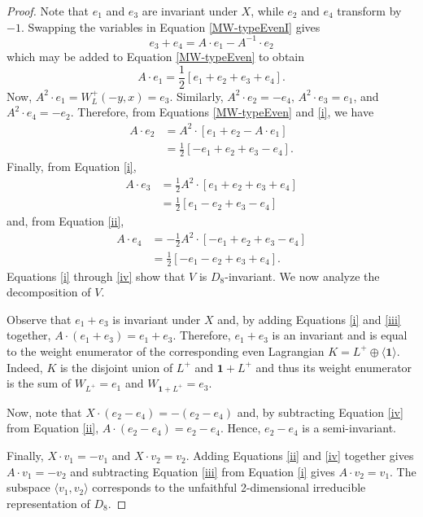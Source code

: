 \documentclass[a4paper,reqno]{amsart}
\theoremstyle{definition}
\theoremstyle{remark} \newtheorem{remark}[theorem]{Remark}
\numberwithin{equation}{section}
\begin{document}
\begin{proof}
    Note that \(e_1\) and \(e_3\) are invariant under \(X\), while \(e_2\) and \(e_4\) transform by \(-1\). Swapping the variables in Equation \eqref{MW-typeEvenI} gives
    \begin{equation*}
        e_3 + e_4 = A \cdot e_1 - A^{-1} \cdot e_2 
    \end{equation*}
    which may be added to Equation \eqref{MW-typeEven} to obtain
    \begin{equation}\label{i}
        A \cdot e_1 = \frac{1}{2}[e_1 + e_2 + e_3 + e_4]. \tag{i}
    \end{equation}
    Now, \(A^2 \cdot e_1 = W_L^+(-y,x) = e_3\). Similarly, \(A^2\cdot e_2 = -e_4,\, A^2\cdot e_3 = e_1\), and \(A^2 \cdot e_4 = -e_2\). Therefore, from Equations \eqref{MW-typeEven} and \eqref{i}, we have
    \begin{align}\label{ii}
        A \cdot e_2 &= A^2 \cdot [e_1 + e_2 - A \cdot e_1]\nonumber \\
        &= \frac{1}{2} [-e_1 + e_2 + e_3 - e_4]. \tag{ii}
    \end{align}
    Finally, from Equation \eqref{i},
    \begin{align}\label{iii}
        A \cdot e_3 &= \frac{1}{2}A^2 \cdot [e_1 + e_2 + e_3 + e_4]\nonumber \\
        &= \frac{1}{2}[e_1 - e_2 + e_3 - e_4] \tag{iii}
    \end{align}
    and, from Equation \eqref{ii},
    \begin{align}\label{iv}
        A \cdot e_4 &= -\frac{1}{2}A^2 \cdot [-e_1 + e_2 + e_3 - e_4]\nonumber \\
        &= \frac{1}{2}[-e_1 - e_2 + e_3 + e_4]. \tag{iv}
    \end{align}
    Equations \eqref{i} through \eqref{iv} show that \(V\) is \(D_8\)-invariant. We now analyze the decomposition of \(V\).

    Observe that \(e_1 + e_3\) is invariant under \(X\) and, by adding Equations \eqref{i} and \eqref{iii} together, \(A \cdot (e_1 + e_3) = e_1 + e_3\). Therefore, \(e_1 + e_3\) is an invariant and is equal to the weight enumerator of the corresponding even Lagrangian \(K = L^+ \oplus \langle \mathbf{1} \rangle\). Indeed, \(K\) is the disjoint union of \(L^+\) and \(\mathbf{1} + L^+\) and thus its weight enumerator is the sum of \(W_{L^+} = e_1\) and \(W_{\mathbf{1} + L^+} = e_3\). 
    
    Now, note that \(X \cdot (e_2 - e_4) = - (e_2 - e_4)\) and, by subtracting Equation \eqref{iv} from Equation \eqref{ii}, \(A \cdot (e_2 - e_4) = e_2 - e_4\). Hence, \(e_2 - e_4\) is a semi-invariant. 
    
    Finally, \(X \cdot v_1 = -v_1\) and \(X \cdot v_2 = v_2\). Adding Equations \eqref{ii} and \eqref{iv} together gives \(A \cdot v_1 = -v_2\) and subtracting Equation \eqref{iii} from Equation \eqref{i} gives \(A \cdot v_2 = v_1\). The subspace \(\langle v_1, v_2 \rangle\) corresponds to the unfaithful 2-dimensional irreducible representation of \(D_8\).
\end{proof}
\end{document}
